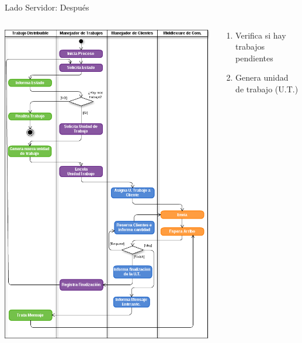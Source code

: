 \begin{frame}{Lado Servidor: Después}
    \begin{columns}[T]
        \begin{column}{.55\textwidth}
            \centering
            \includegraphics[scale=0.2]{images/ActivityFuDServer-Duplex.png}
        \end{column}
        \begin{column}{.45\textwidth}
            \begin{enumerate}
                \item   Verifica si hay trabajos pendientes
                \vspace{0.2cm}
                \item   Genera unidad de trabajo (U.T.)
                \vspace{0.2cm}

\end{enumerate}
\end{column}
\end{columns}
\end{frame}
